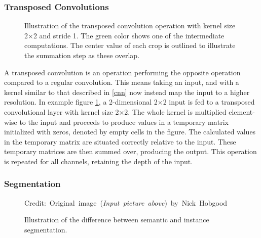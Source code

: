 \subsubsection{Transposed Convolutions}
    \begin{figure}[H]
        \centering
        
        
        
        \caption[Transposed convolution]{Illustration of the transposed convolution operation with kernel size 2×2 and stride 1. The green color shows one of the intermediate computations. The center value of each crop is outlined to illustrate the summation step as these overlap.}
      	\medskip 
        \label{transposed_conv_fig}
    \end{figure}
    A transposed convolution is an operation performing the opposite operation compared to a regular convolution\cite{dumoulin2016guide_transposed_convolution}. This means taking an input, and with a kernel similar to that described in \ref{cnn} now instead map the input to a higher resolution. In example figure \ref{transposed_conv_fig}, a 2-dimensional 2×2 input is fed to a transposed convolutional layer with kernel size 2×2. The whole kernel is multiplied element-wise to the input and proceeds to produce values in a temporary matrix initialized with zeros, denoted by empty cells in the figure. The calculated values in the temporary matrix are situated correctly relative to the input. These temporary matrices are then summed over, producing the output. This operation is repeated for all channels, retaining the depth of the input. 
            


\subsubsection{Segmentation}
    \begin{figure}[H]
        \centering
        
        \caption[Difference between semantic and instance segmentation]{Illustration of the difference between semantic and instance segmentation.}
      	\medskip 
        \hspace*{15pt}\hbox{\scriptsize Credit: Original image (\textit{Input picture above}) by Nick Hobgood\cite{clownfish_image}}
        \label{segmentation_fig}
    \end{figure}

